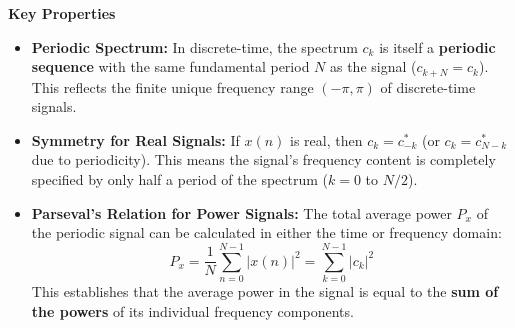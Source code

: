 \textbf{Key Properties}

\begin{itemize}
\tightlist
\item
  \textbf{Periodic Spectrum:} In discrete-time, the spectrum \({c_k}\)
  is itself a \textbf{periodic sequence} with the same fundamental
  period \(N\) as the signal (\(c_{k+N} = c_k\)). This reflects the
  finite unique frequency range \((-\pi, \pi)\) of discrete-time
  signals.
\item
  \textbf{Symmetry for Real Signals:} If \(x(n)\) is real, then
  \(c_k = c_{-k}^{*}\) (or \(c_k = c_{N-k}^{*}\) due to periodicity).
  This means the signal's frequency content is completely specified by
  only half a period of the spectrum (\(k = 0\) to \(N/2\)).
\item
  \textbf{Parseval's Relation for Power Signals:} The total average
  power \(P_x\) of the periodic signal can be calculated in either the
  time or frequency domain:
  \[P_x = \frac{1}{N} \sum_{n=0}^{N-1} |x(n)|^2 = \sum_{k=0}^{N-1} |c_k|^2\]
  This establishes that the average power in the signal is equal to the
  \textbf{sum of the powers} of its individual frequency components.
\end{itemize}

